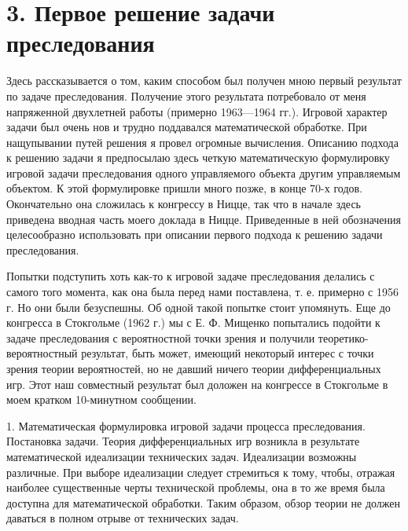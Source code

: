 \documentclass[10pt]{article}
\begin{document}
\section*{3. Первое решение задачи преследования}

Здесь рассказывается о том, каким способом был получен мною первый результат по задаче преследования. Получение этого результата потребовало от меня напряженной двухлетней работы (примерно 1963—1964 гг.). Игровой характер задачи был очень нов и трудно поддавался математической обработке. При нащупывании путей решения я провел огромные вычисления. Описанию подхода к решению задачи я предпосылаю здесь четкую математическую формулировку игровой задачи преследования одного управляемого объекта другим управляемым объектом. К этой формулировке пришли много позже, в конце 70-х годов. Окончательно она сложилась к конгрессу в Ницце, так что в начале здесь приведена вводная часть моего доклада в Ницце. Приведенные в ней обозначения целесообразно использовать при описании первого подхода к решению задачи преследования.

Попытки подступить хоть как-то к игровой задаче преследования делались с самого того момента, как она была перед нами поставлена, т. е. примерно с 1956 г. Но они были безуспешны. Об одной такой попытке стоит упомянуть. Еще до конгресса в Стокгольме (1962 г.) мы с Е. Ф. Мищенко попытались подойти к задаче преследования с вероятностной точки зрения и получили теоретико-вероятностный результат, быть может, имеющий некоторый интерес с точки зрения теории вероятностей, но не давший ничего теории дифференциальных игр. Этот наш совместный результат был доложен на конгрессе в Стокгольме в моем кратком 10-минутном сообщении.

1. Математическая формулировка игровой задачи процесса преследования. Постановка задачи. Теория дифференциальных игр возникла в результате математической идеализации технических задач. Идеализации возможны различные. При выборе идеализации следует стремиться к тому, чтобы, отражая наиболее существенные черты технической проблемы, она в то же время была доступна для математической обработки. Таким образом, обзор теории не должен даваться в полном отрыве от технических задач.
\end{document}
